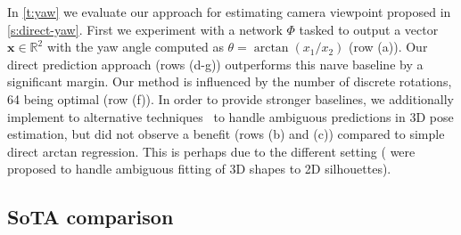 In \cref{t:yaw} we evaluate our approach for estimating camera viewpoint proposed in \cref{s:direct-yaw}.
First we experiment with a network $\Phi$ tasked to output a vector $\mathbf{x} \in \mathbb{R}^2$ with the yaw angle computed as $\theta = \arctan(x_1/x_2)$ (row (a)).
Our direct prediction approach (rows (d-g)) outperforms this na{\:\i}ve baseline by a significant margin.
Our method is influenced by the number of discrete rotations, 64 being optimal (row (f)).
In order to provide stronger baselines, we additionally implement to alternative techniques~\cite{insafutdinov18pointclouds,goel20shape} to handle ambiguous predictions in 3D pose estimation, but did not observe a benefit (rows (b) and (c)) compared to simple direct arctan regression.
This is perhaps due to the different setting (\cite{insafutdinov18pointclouds,goel20shape} were proposed to handle ambiguous fitting of 3D shapes to 2D silhouettes).



\subsection{SoTA comparison}

